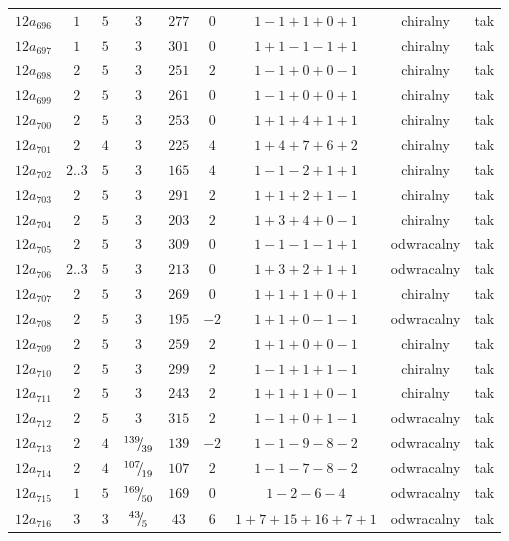 \begin{longtable}{ccccccccc}
$12a_{696}$ & $1$ & $5$ & $3$ & $277$ & $0$ & $1-1+1+0+1$ & chiralny & tak \\
$12a_{697}$ & $1$ & $5$ & $3$ & $301$ & $0$ & $1+1-1-1+1$ & chiralny & tak \\
$12a_{698}$ & $2$ & $5$ & $3$ & $251$ & $2$ & $1-1+0+0-1$ & chiralny & tak \\
$12a_{699}$ & $2$ & $5$ & $3$ & $261$ & $0$ & $1-1+0+0+1$ & chiralny & tak \\
$12a_{700}$ & $2$ & $5$ & $3$ & $253$ & $0$ & $1+1+4+1+1$ & chiralny & tak \\
$12a_{701}$ & $2$ & $4$ & $3$ & $225$ & $4$ & $1+4+7+6+2$ & chiralny & tak \\
$12a_{702}$ & $2..3$ & $5$ & $3$ & $165$ & $4$ & $1-1-2+1+1$ & chiralny & tak \\
$12a_{703}$ & $2$ & $5$ & $3$ & $291$ & $2$ & $1+1+2+1-1$ & chiralny & tak \\
$12a_{704}$ & $2$ & $5$ & $3$ & $203$ & $2$ & $1+3+4+0-1$ & chiralny & tak \\
$12a_{705}$ & $2$ & $5$ & $3$ & $309$ & $0$ & $1-1-1-1+1$ & odwracalny & tak \\
$12a_{706}$ & $2..3$ & $5$ & $3$ & $213$ & $0$ & $1+3+2+1+1$ & odwracalny & tak \\
$12a_{707}$ & $2$ & $5$ & $3$ & $269$ & $0$ & $1+1+1+0+1$ & chiralny & tak \\
$12a_{708}$ & $2$ & $5$ & $3$ & $195$ & $-2$ & $1+1+0-1-1$ & odwracalny & tak \\
$12a_{709}$ & $2$ & $5$ & $3$ & $259$ & $2$ & $1+1+0+0-1$ & chiralny & tak \\
$12a_{710}$ & $2$ & $5$ & $3$ & $299$ & $2$ & $1-1+1+1-1$ & chiralny & tak \\
$12a_{711}$ & $2$ & $5$ & $3$ & $243$ & $2$ & $1+1+1+0-1$ & chiralny & tak \\
$12a_{712}$ & $2$ & $5$ & $3$ & $315$ & $2$ & $1-1+0+1-1$ & odwracalny & tak \\
$12a_{713}$ & $2$ & $4$ & ${}^{139}{\mskip -5mu/\mskip -3mu}_{39}$ & $139$ & $-2$ & $1-1-9-8-2$ & odwracalny & tak \\
$12a_{714}$ & $2$ & $4$ & ${}^{107}{\mskip -5mu/\mskip -3mu}_{19}$ & $107$ & $2$ & $1-1-7-8-2$ & odwracalny & tak \\
$12a_{715}$ & $1$ & $5$ & ${}^{169}{\mskip -5mu/\mskip -3mu}_{50}$ & $169$ & $0$ & $1-2-6-4$ & odwracalny & tak \\
$12a_{716}$ & $3$ & $3$ & ${}^{43}{\mskip -5mu/\mskip -3mu}_{5}$ & $43$ & $6$ & $1+7+15+16+7+1$ & odwracalny & tak \\

\end{longtable}
